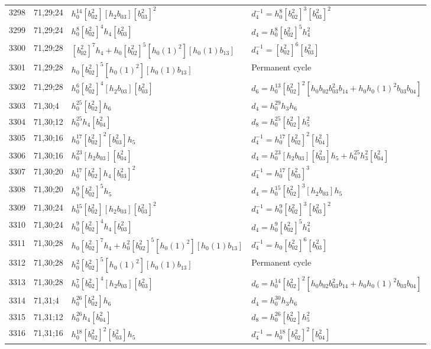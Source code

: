 \documentclass{article}
\begin{document}
\begin{longtable}{|l|l|>{\raggedright\arraybackslash}p{6cm}|>{\raggedright\arraybackslash}p{6cm}|}
\hline
3298 & 71,29;24 & $h_0^{14}[b_{02}^2][h_2b_{03}][b_{03}^2]^2$ & $d_{4}^{-1}=h_0^8[b_{02}^2]^3[b_{03}^2]^2$\\
3299 & 71,29;24 & $h_0^8[b_{02}^2]^4h_4[b_{03}^2]$ &$d_{4}=h_0^8[b_{02}^2]^5h_4^2$\\
\hline
3300 & 71,29;28 & $[b_{02}^2]^7h_4 + h_0[b_{02}^2]^5[h_0(1)^2][h_0(1)b_{13}]$ & $d_{4}^{-1}=[b_{02}^2]^6[b_{03}^2]$\\
3301 & 71,29;28 & $h_0[b_{02}^2]^5[h_0(1)^2][h_0(1)b_{13}]$ & Permanent cycle\\
3302 & 71,29;28 & $h_0^6[b_{02}^2]^4[h_2b_{03}][b_{03}^2]$ &$d_{6}=h_0^{13}[b_{02}^2]^2[h_0b_{02}b_{03}^2b_{14} + h_0h_0(1)^2b_{03}b_{04}]$\\
\hline
3303 & 71,30;4 & $h_0^{25}[b_{02}^2]h_6$ &$d_{4}=h_0^{29}h_3h_6$\\
\hline
3304 & 71,30;12 & $h_0^{25}h_4[b_{04}^2]$ &$d_{8}=h_0^{25}[b_{02}^2]h_5^2$\\
\hline
3305 & 71,30;16 & $h_0^{17}[b_{02}^2]^2[b_{03}^2]h_5$ & $d_{4}^{-1}=h_0^{17}[b_{02}^2]^2[b_{04}^2]$\\
3306 & 71,30;16 & $h_0^{23}[h_2b_{03}][b_{04}^2]$ &$d_{4}=h_0^{23}[h_2b_{03}][b_{03}^2]h_5 + h_0^{25}h_3^2[b_{04}^2]$\\
\hline
3307 & 71,30;20 & $h_0^{17}[b_{02}^2]h_4[b_{03}^2]^2$ & $d_{4}^{-1}=h_0^{17}[b_{03}^2]^3$\\
3308 & 71,30;20 & $h_0^9[b_{02}^2]^5h_5$ &$d_{4}=h_0^{15}[b_{02}^2]^3[h_2b_{03}]h_5$\\
\hline
3309 & 71,30;24 & $h_0^{15}[b_{02}^2][h_2b_{03}][b_{03}^2]^2$ & $d_{4}^{-1}=h_0^9[b_{02}^2]^3[b_{03}^2]^2$\\
3310 & 71,30;24 & $h_0^9[b_{02}^2]^4h_4[b_{03}^2]$ &$d_{4}=h_0^9[b_{02}^2]^5h_4^2$\\
\hline
3311 & 71,30;28 & $h_0[b_{02}^2]^7h_4 + h_0^2[b_{02}^2]^5[h_0(1)^2][h_0(1)b_{13}]$ & $d_{4}^{-1}=h_0[b_{02}^2]^6[b_{03}^2]$\\
3312 & 71,30;28 & $h_0^2[b_{02}^2]^5[h_0(1)^2][h_0(1)b_{13}]$ & Permanent cycle\\
3313 & 71,30;28 & $h_0^7[b_{02}^2]^4[h_2b_{03}][b_{03}^2]$ &$d_{6}=h_0^{14}[b_{02}^2]^2[h_0b_{02}b_{03}^2b_{14} + h_0h_0(1)^2b_{03}b_{04}]$\\
\hline
3314 & 71,31;4 & $h_0^{26}[b_{02}^2]h_6$ &$d_{4}=h_0^{30}h_3h_6$\\
\hline
3315 & 71,31;12 & $h_0^{26}h_4[b_{04}^2]$ &$d_{8}=h_0^{26}[b_{02}^2]h_5^2$\\
\hline
3316 & 71,31;16 & $h_0^{18}[b_{02}^2]^2[b_{03}^2]h_5$ & $d_{4}^{-1}=h_0^{18}[b_{02}^2]^2[b_{04}^2]$\\

\end{longtable}
\end{document}
